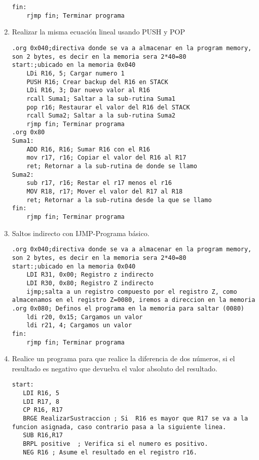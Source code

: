 \documentclass[
	12pt, %
	fleqn, %
	a4paper, %
]{LegrandOrangeBook}
\begin{document}
\begin{enumerate}
\begin{lstlisting}[language={[x86masm]Assembler},frame=single,caption={Resolución de ecuación lineal},captionpos=b,numbers=none]
fin:
	rjmp fin; Terminar programa
\end{lstlisting}
\item Realizar la misma ecuación lineal usando PUSH y POP
\begin{lstlisting}[language={[x86masm]Assembler},frame=single,caption={Ecuación lineal con PUSH y POP},captionpos=b,numbers=none]
.org 0x040;directiva donde se va a almacenar en la program memory, son 2 bytes, es decir en la memoria sera 2*40=80
start:;ubicado en la memoria 0x040
	LDi R16, 5; Cargar numero 1
	PUSH R16; Crear backup del R16 en STACK
	LDi R16, 3; Dar nuevo valor al R16
	rcall Suma1; Saltar a la sub-rutina Suma1
	pop r16; Restaurar el valor del R16 del STACK
	rcall Suma2; Saltar a la sub-rutina Suma2
	rjmp fin; Terminar programa
.org 0x80
Suma1:
	ADD R16, R16; Sumar R16 con el R16
	mov r17, r16; Copiar el valor del R16 al R17
	ret; Retornar a la sub-rutina de donde se llamo
Suma2:
	sub r17, r16; Restar el r17 menos el r16
	MOV R18, r17; Mover el valor del R17 al R18
	ret; Retornar a la sub-rutina desde la que se llamo
fin:
	rjmp fin; Terminar programa
\end{lstlisting}
\item Saltos indirecto con IJMP-Programa básico.
\begin{lstlisting}[language={[x86masm]Assembler},frame=single,caption={Programa básico-IJMP},captionpos=b,numbers=none]
.org 0x040;directiva donde se va a almacenar en la program memory, son 2 bytes, es decir en la memoria sera 2*40=80
start:;ubicado en la memoria 0x040
	LDI R31, 0x00; Registro z indirecto
	LDI R30, 0x80; Registro Z indirecto
	ijmp;salta a un registro compuesto por el registro Z, como almacenamos en el registro Z=0080, iremos a direccion en la memoria
.org 0x080; Definos el programa en la memoria para saltar (0080)
	ldi r20, 0x15; Cargamos un valor
	ldi r21, 4; Cargamos un valor
fin:
	rjmp fin; Terminar programa
\end{lstlisting}
\item Realice un programa para que realice la diferencia de dos números, si el resultado es negativo que devuelva el valor absoluto del resultado.
\begin{lstlisting}[language={[x86masm]Assembler},frame=single,caption={Desarrolo entre más de 2 sub-rutinas},captionpos=b,numbers=none]
start:
   LDI R16, 5
   LDI R17, 8
   CP R16, R17
   BRGE RealizarSustraccion ; Si  R16 es mayor que R17 se va a la funcion asignada, caso contrario pasa a la siguiente linea.
   SUB R16,R17
   BRPL positive  ; Verifica si el numero es positivo.
   NEG R16 ; Asume el resultado en el registro r16.

\end{lstlisting}
\end{enumerate}
\end{document}
